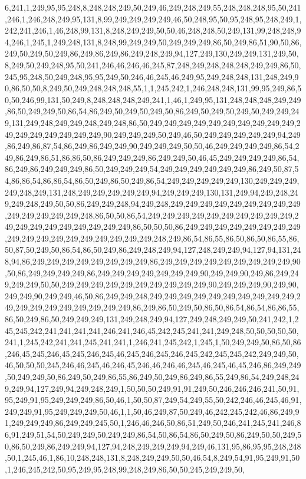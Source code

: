 6,241,1,249,95,95,248,8,248,248,249,50,249,46,249,248,249,55,248,248,248,95,50,241,246,1,246,248,249,95,131,8,99,249,249,249,249,46,50,248,95,50,95,248,95,248,249,1,242,241,246,1,46,248,99,131,8,248,249,249,50,50,46,248,248,50,249,131,99,248,248,94,246,1,245,1,249,248,131,8,248,99,249,249,50,249,249,249,86,50,249,86,51,90,50,86,249,50,249,50,249,86,249,86,249,86,249,248,249,94,127,249,130,249,249,131,249,50,8,249,50,249,248,95,50,241,246,46,246,46,245,87,248,249,248,248,248,249,249,86,50,245,95,248,50,249,248,95,95,249,50,246,46,245,46,249,95,249,248,248,131,248,249,90,86,50,50,8,249,50,249,248,248,248,55,1,1,245,242,1,246,248,248,131,99,95,249,86,50,50,246,99,131,50,249,8,248,248,248,249,241,1,46,1,249,95,131,248,248,248,249,249,86,50,249,249,50,86,54,86,249,50,249,50,249,50,86,249,50,249,50,249,50,249,249,249,131,249,248,249,249,248,249,248,86,50,249,249,249,249,249,249,249,249,249,249,249,249,249,249,249,249,249,90,249,249,249,50,249,46,50,249,249,249,249,249,94,249,86,249,86,87,54,86,249,86,249,249,90,249,249,249,50,50,46,249,249,249,249,86,54,249,86,249,86,51,86,86,50,86,249,249,249,86,249,249,50,46,45,249,249,249,249,86,54,86,249,86,249,249,249,86,50,249,249,249,54,249,249,249,249,249,249,86,249,50,87,54,86,86,54,86,86,54,86,50,249,86,50,249,86,54,249,249,249,249,249,130,249,249,249,249,248,249,131,248,249,249,249,249,249,94,249,249,249,130,131,249,94,249,248,249,249,248,249,50,50,86,249,249,248,94,249,248,249,249,249,249,249,249,249,249,249,249,249,249,249,249,248,86,50,50,86,54,249,249,249,249,249,249,249,249,249,249,249,249,249,249,249,249,249,249,249,86,50,50,50,86,249,249,249,249,249,249,249,249,249,249,249,249,249,249,249,249,249,249,248,249,86,54,86,55,86,50,86,50,86,55,86,50,87,50,249,50,86,54,86,50,249,86,249,248,249,94,127,248,249,249,94,127,94,131,248,94,86,249,249,249,249,249,249,249,249,86,249,249,249,249,249,249,249,249,249,90,50,86,249,249,249,249,86,249,249,249,249,249,249,249,90,249,249,90,249,86,249,249,249,249,50,50,249,249,249,249,249,249,249,249,249,249,90,249,249,249,90,249,90,249,249,90,249,249,46,50,86,249,249,248,249,249,249,249,249,249,249,249,249,249,249,249,249,249,249,249,249,249,249,86,249,86,50,249,50,86,50,86,54,86,54,86,86,55,86,50,249,86,50,249,249,249,131,249,248,249,94,127,249,248,249,249,50,241,242,1,245,245,242,241,241,241,241,246,241,246,45,242,245,241,241,249,248,50,50,50,50,50,241,1,245,242,241,241,245,241,241,1,246,241,245,242,1,245,1,50,249,249,50,86,50,86,246,45,245,246,45,245,246,245,46,245,246,245,246,245,242,245,245,242,249,249,50,46,50,50,50,245,246,46,245,46,246,45,246,46,246,46,245,46,245,46,45,246,86,249,249,50,249,249,50,86,249,50,249,86,55,86,249,50,249,86,249,86,55,249,86,54,249,248,249,249,94,127,249,94,249,248,249,1,50,50,50,249,91,91,249,50,246,246,246,241,50,91,95,249,91,95,249,249,249,86,50,46,1,50,50,87,249,54,249,55,50,242,246,46,245,46,91,249,249,91,95,249,249,249,50,46,1,1,50,46,249,87,50,249,46,242,245,242,46,86,249,91,249,249,249,86,249,249,245,50,1,246,46,246,50,86,51,249,50,246,241,245,241,246,86,91,249,51,54,50,249,249,50,249,249,86,54,50,86,54,86,50,249,50,86,249,50,50,249,50,86,50,249,86,249,249,94,127,94,248,249,249,249,94,249,46,131,95,86,95,95,248,248,50,1,245,46,1,86,10,248,248,131,8,248,249,249,50,50,46,54,8,249,54,91,95,249,91,50,1,246,245,242,50,95,249,95,248,99,248,249,86,50,50,245,249,249,50,
